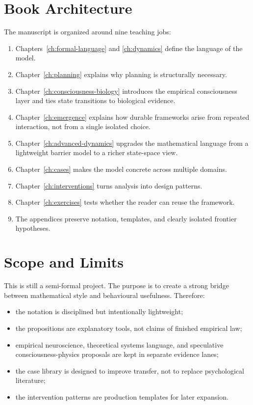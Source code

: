 \section{Book Architecture}

The manuscript is organized around nine teaching jobs:
\begin{enumerate}[nosep]
  \item Chapters~\ref{ch:formal-language} and \ref{ch:dynamics} define the
        language of the model.
  \item Chapter~\ref{ch:planning} explains why planning is structurally
        necessary.
  \item Chapter~\ref{ch:consciousness-biology} introduces the empirical
        consciousness layer and ties state transitions to biological evidence.
  \item Chapter~\ref{ch:emergence} explains how durable frameworks arise from
        repeated interaction, not from a single isolated choice.
  \item Chapter~\ref{ch:advanced-dynamics} upgrades the mathematical language
        from a lightweight barrier model to a richer state-space view.
  \item Chapter~\ref{ch:cases} makes the model concrete across multiple
        domains.
  \item Chapter~\ref{ch:interventions} turns analysis into design patterns.
  \item Chapter~\ref{ch:exercises} tests whether the reader can reuse the
        framework.
  \item The appendices preserve notation, templates, and clearly isolated
        frontier hypotheses.
\end{enumerate}

\section{Scope and Limits}

This is still a semi-formal project. The purpose is to create a strong bridge
between mathematical style and behavioural usefulness. Therefore:
\begin{itemize}[nosep]
  \item the notation is disciplined but intentionally lightweight;
  \item the propositions are explanatory tools, not claims of finished
        empirical law;
  \item empirical neuroscience, theoretical systems language, and speculative
        consciousness-physics proposals are kept in separate evidence lanes;
  \item the case library is designed to improve transfer, not to replace
        psychological literature;
  \item the intervention patterns are production templates for later expansion.
\end{itemize}

